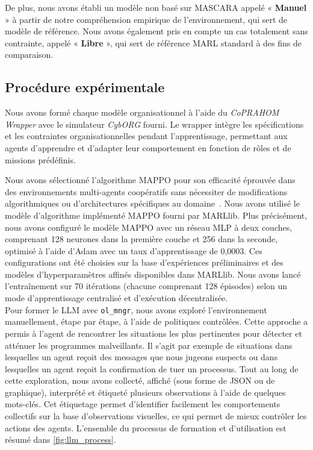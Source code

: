 De plus, nous avons établi un modèle non basé sur MASCARA appelé « \textbf{Manuel} » à partir de notre compréhension empirique de l'environnement, qui sert de modèle de référence.
Nous avons également pris en compte un cas totalement sans contrainte, appelé « \textbf{Libre} », qui sert de référence MARL standard à des fins de comparaison.


\subsection{Procédure expérimentale}

Nous avons formé chaque modèle organisationnel à l'aide du \textit{CoPRAHOM Wrapper} avec le simulateur \textit{CybORG} fourni. Le wrapper intègre les spécifications et les contraintes organisationnelles pendant l'apprentissage, permettant aux agents d'apprendre et d'adapter leur comportement en fonction de rôles et de missions prédéfinis.

Nous avons sélectionné l'algorithme MAPPO pour son efficacité éprouvée dans des environnements multi-agents coopératifs sans nécessiter de modifications algorithmiques ou d'architectures spécifiques au domaine~\cite{Yu2022}. Nous avons utilisé le modèle d'algorithme implémenté MAPPO fourni par MARLlib. Plus précisément, nous avons configuré le modèle MAPPO avec un réseau MLP à deux couches, comprenant 128 neurones dans la première couche et 256 dans la seconde, optimisé à l'aide d'Adam avec un taux d'apprentissage de 0,0003. Ces configurations ont été choisies sur la base d'expériences préliminaires et des modèles d'hyperparamètres affinés disponibles dans MARLlib. Nous avons lancé l'entraînement sur 70 itérations (chacune comprenant 128 épisodes) selon un mode d'apprentissage centralisé et d'exécution décentralisée.\\

Pour former le LLM avec \texttt{ol\_mngr}, nous avons exploré l'environnement manuellement, étape par étape, à l'aide de politiques contrôlées. Cette approche a permis à l'agent de rencontrer les situations les plus pertinentes pour détecter et atténuer les programmes malveillants. Il s'agit par exemple de situations dans lesquelles un agent reçoit des messages que nous jugeons suspects ou dans lesquelles un agent reçoit la confirmation de tuer un processus. Tout au long de cette exploration, nous avons collecté, affiché (sous forme de JSON ou de graphique), interprété et étiqueté plusieurs observations à l'aide de quelques mots-clés. Cet étiquetage permet d'identifier facilement les comportements collectifs sur la base d'observations visuelles, ce qui permet de mieux contrôler les actions des agents. L'ensemble du processus de formation et d'utilisation est résumé dans \autoref{fig:llm_process}.

